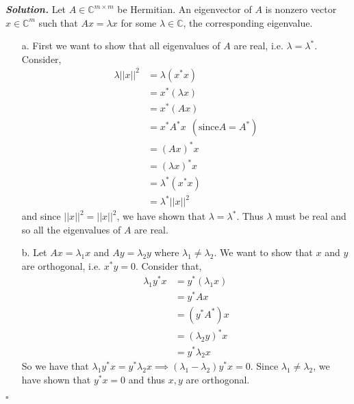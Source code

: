 \documentclass[12pt]{report}
\newenvironment{solution}[1][\it{Solution}]{\textbf{#1. } }{$\square$}
\def\C{{\mathbb C}}
\begin{document}
\begin{solution}
    \noindent
    Let $A \in \C^{m \times m}$ be Hermitian. An eigenvector of $A$ is nonzero vector $x \in \C^m$ such that $Ax = \lambda x$ for some $\lambda \in \C$, the corresponding eigenvalue.

    \begin{enumerate}
        \item [a.]
        First we want to show that all eigenvalues of $A$ are real, i.e. $\lambda = \lambda^*$. Consider,
        \begin{align*}
            \lambda ||x||^2 &= \lambda(x^*x)\\
            &=x^*(\lambda x)\\
            &=x^*(Ax)\\
            &=x^*A^*x ~~ (\text{since} A=A^*)\\
            &=(Ax)^*x\\
            &=(\lambda x)^*x\\
            &=\lambda^*(x^*x)\\
            &=\lambda^*||x||^2
        \end{align*}
        and since $||x||^2 = ||x||^2$, we have shown that $\lambda = \lambda^*$. Thus $\lambda$ must be real and so all the eigenvalues of $A$ are real.

        \item [b.]
        Let $Ax = \lambda_1 x$ and $Ay = \lambda_2 y$ where $\lambda_1 \neq \lambda_2$. We want to show that $x$ and $y$ are orthogonal, i.e. $x^*y = 0$. 
        Consider that,
        \begin{align*}
            \lambda_1y^*x &= y^*(\lambda_1x)\\
            &=y^*Ax\\
            &=(y^*A^*)x\\
            &=(\lambda_2y)^*x\\
            &=y^*\lambda_2x
        \end{align*} 
        So we have that $\lambda_1y^*x = y^*\lambda_2x \implies (\lambda_1 - \lambda_2)y^*x = 0$. Since $\lambda_1 \neq \lambda_2$, we have shown that $y^*x = 0$ and thus $x,y$ are orthogonal. 
    \end{enumerate}
\end{solution}

\vskip 20pt

\end{document}
